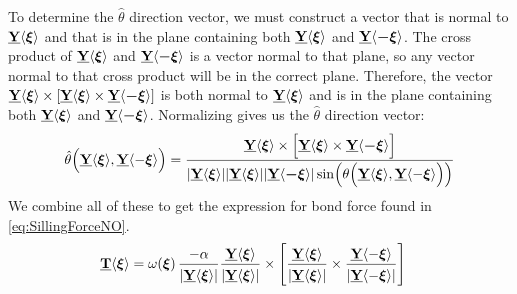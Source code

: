 \documentclass[preprint,review,12pt]{elsarticle}
\newcommand\vstate[3]{%
	\mathbf{\underline{#1}}%
	\ifstrempty{#2}{}{[#2]}%
	\ifstrempty{#3}{}{\langle #3 \rangle}}
\newcommand\tvstate[3]{%
	\mathbf{\underline{#1}\vphantom{\hat{\underline{#1}}}}%
	\ifstrempty{#2}{}{[#2]}%
	\ifstrempty{#3}{}{\langle #3 \rangle}}
\begin{document}
%
To determine the $\hat{\theta}$ direction vector, we must construct a vector that is normal to $\tvstate{Y}{}{\boldsymbol{\xi}}$ and that is in the plane containing both $\vstate{Y}{}{\boldsymbol{\xi}}$ and $\vstate{Y}{}{\boldsymbol{-\xi}}$.
The cross product of $\vstate{Y}{}{\boldsymbol{\xi}}$ and $\vstate{Y}{}{\boldsymbol{-\xi}}$ is a vector normal to that plane, so any vector normal to that cross product will be in the correct plane.
Therefore, the vector $\vstate{Y}{}{\boldsymbol{\xi}}\times\left[\vstate{Y}{}{\boldsymbol{\xi}}\times\vstate{Y}{}{\boldsymbol{-\xi}}\right]$ is both normal to $\vstate{Y}{}{\boldsymbol{\xi}}$ and is in the plane containing both $\vstate{Y}{}{\boldsymbol{\xi}}$ and $\vstate{Y}{}{\boldsymbol{-\xi}}$.
Normalizing gives us the $\hat{\theta}$ direction vector:
%
\begin{equation}
\hat{\theta}\!\left(\tvstate{Y}{}{\boldsymbol{\xi}},\tvstate{Y}{}{-\boldsymbol{\xi}}\right)=
\frac{\tvstate{Y}{}{\boldsymbol{\xi}}\times\left[\tvstate{Y}{}{\boldsymbol{\xi}}\times\tvstate{Y}{}{\boldsymbol{-\xi}}\right]}{|\tvstate{Y}{}{\boldsymbol{\xi}}||\tvstate{Y}{}{\boldsymbol{\xi}}||\tvstate{Y}{}{\boldsymbol{-\xi}}|\sin\!\left(\theta\!\left(\tvstate{Y}{}{\boldsymbol{\xi}},\tvstate{Y}{}{-\boldsymbol{\xi}}\right)\right)}\notag 
\end{equation}
%
We combine all of these to get the expression for bond force found in \cref{eq:SillingForceNO}.
\begin{align}
%
\tvstate{T}{}{\boldsymbol{\xi}} &=
\omega\!\left(\boldsymbol{\xi}\right)\frac{-\alpha}{|\tvstate{Y}{}{\boldsymbol{\xi}}|} \frac{\tvstate{Y}{}{\boldsymbol{\xi}}}{|\tvstate{Y}{}{\boldsymbol{\xi}}|} \times 
\left[\frac{\tvstate{Y}{}{\boldsymbol{\xi}}}{|\tvstate{Y}{}{\boldsymbol{\xi}}|} \times 
\frac{\tvstate{Y}{}{-\boldsymbol{\xi}}}{|\tvstate{Y}{}{-\boldsymbol{\xi}}|}\right]\notag
\end{align}
%



\end{document}
